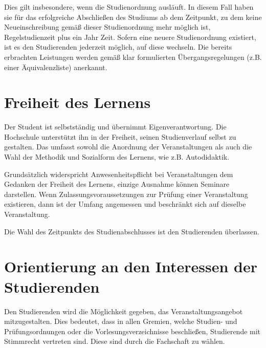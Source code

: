 Dies gilt insbesondere, wenn die Studienordnung ausläuft. In diesem Fall haben sie für das erfolgreiche Abschließen des Studiums ab dem Zeitpunkt, zu dem keine Neueinschreibung gemäß dieser Studienordnung mehr möglich ist, Regelstudienzeit plus ein Jahr Zeit. Sofern eine neuere Studienordnung existiert, ist es den Studierenden jederzeit möglich, auf diese wechseln. Die bereits erbrachten Leistungen werden gemäß klar formulierten Übergangsregelungen (z.B. einer Äquivalenzliste) anerkannt.

\section{Freiheit des Lernens}

Der Student ist selbstständig und übernimmt Eigenverantwortung. Die Hochschule unterstützt ihn in der Freiheit, seinen Studienverlauf selbst zu gestalten. Das umfasst sowohl die Anordnung der Veranstaltungen als auch die Wahl der Methodik und Sozialform des Lernens, wie z.B. Autodidaktik.

Grundsätzlich widerspricht Anwesenheitspflicht bei Veranstaltungen dem Gedanken der Freiheit des Lernens, einzige Ausnahme können Seminare darstellen. Wenn Zulassungsvoraussetzungen zur Prüfung einer Veranstaltung existieren, dann ist der Umfang angemessen und beschränkt sich auf dieselbe Veranstaltung.

Die Wahl des Zeitpunkts des Studienabschlusses ist den Studierenden überlassen.

\section{Orientierung an den Interessen der Studierenden}

Den Studierenden wird die Möglichkeit gegeben, das Veranstaltungsangebot mitzugestalten. Dies bedeutet, dass in allen Gremien, welche Studien- und Prüfungsordnungen oder die Vorlesungsverzeichnisse beschließen, Studierende mit Stimmrecht vertreten sind. Diese sind durch die Fachschaft zu wählen.
